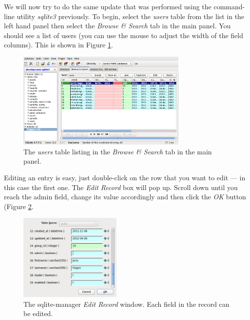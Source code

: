 \documentclass[12pt,twoside]{article}
\begin{document}
We will now try to do the same update that was performed using the
command-line utility \emph{sqlite3} previously. To begin, select the
\emph{users} table from the list in the left hand panel then select
the \emph{Browse \& Search} tab in the main panel. You should see a list
of users (you can use the mouse to adjust the width of the field columns).
This is shown in Figure \ref{fig:sqlitemanagerlist}.

\begin{figure}[!htb]
\begin{center}
\includegraphics[width=0.75\textwidth]{sqlitemanlist}
\caption{The \emph{users} table listing in the \emph{Browse \& Search}
tab in the main panel.%
\label{fig:sqlitemanagerlist}}
\end{center}
\end{figure}

Editing an entry is easy, just double-click on the row that you want to edit
--- in this case the first one. The \emph{Edit Record} box will pop up.
Scroll down until you reach the admin field, change its value
accordingly and then click the \emph{OK} button 
(Figure \ref{fig:sqlitemanageredit}.

\begin{figure}[!htb]
\begin{center}
\includegraphics[width=0.45\textwidth]{sqlitemanedit}
\caption{The sqlite-manager \emph{Edit Record} window. Each field in the
record can be edited.\label{fig:sqlitemanageredit}}
\end{center}
\end{figure}
\end{document}
